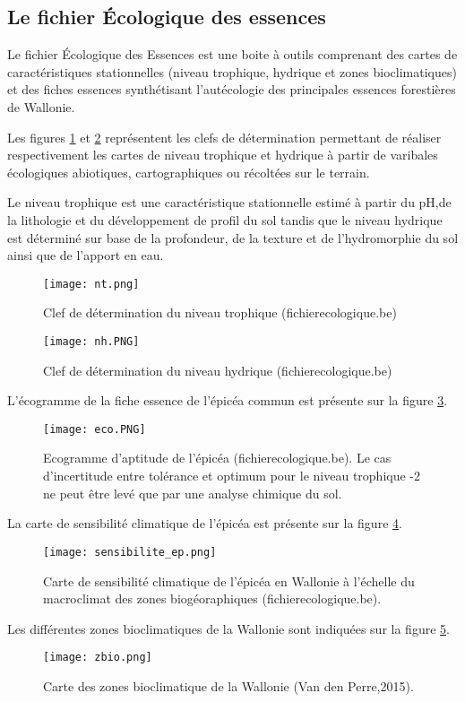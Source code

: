 \subsection{Le fichier Écologique des essences }


Le fichier Écologique des Essences est une boite à outils comprenant des cartes de caractéristiques stationnelles (niveau trophique, hydrique et zones bioclimatiques) et des fiches essences synthétisant l'autécologie des principales essences forestières de Wallonie.

Les figures \ref{fig:nt} et \ref{fig:nh} représentent les clefs de détermination permettant de réaliser respectivement les cartes de niveau trophique et hydrique à partir de varibales écologiques abiotiques, cartographiques ou récoltées sur le terrain.

Le niveau trophique est une caractéristique stationnelle estimé à partir du pH,de la lithologie et du développement de profil du sol tandis que le niveau hydrique est déterminé sur base de la profondeur, de la texture et  de l'hydromorphie du sol ainsi que  de l'apport en eau.

\begin{figure} [htbp] 
    \centering
    \texttt{[image: nt.png]}
    \caption{Clef de détermination du niveau trophique (fichierecologique.be)}
    \label{fig:nt}
\end{figure}
 
\begin{figure} [htbp] 
    \centering
    \texttt{[image: nh.PNG]}
    \caption{Clef de détermination du niveau hydrique (fichierecologique.be) }
    \label{fig:nh}
\end{figure}


L'écogramme de la fiche essence de l'épicéa commun est présente sur la figure \ref{fig:eco}.
\begin{figure} [htbp] 
    \centering
    \texttt{[image: eco.PNG]}
    \caption{Ecogramme d'aptitude de l'épicéa (fichierecologique.be). Le cas d'incertitude entre tolérance et optimum pour le niveau trophique -2 ne peut être levé que par une analyse chimique du sol. }
    \label{fig:eco}
\end{figure}

La carte de sensibilité climatique de l'épicéa est présente sur la figure \ref{fig:sens}.
\begin{figure} [htbp] 
    \centering
    \texttt{[image: sensibilite\_ep.png]}
    \caption{Carte de sensibilité climatique de l'épicéa en Wallonie à l'échelle du macroclimat des zones biogéoraphiques (fichierecologique.be).}
    \label{fig:sens}
\end{figure}
Les différentes zones bioclimatiques de la Wallonie sont indiquées sur la figure \ref{fig:zbio}.
\begin{figure} [htbp] 
    \centering
    \texttt{[image: zbio.png]}
    \caption{Carte des zones bioclimatique de la Wallonie (Van den Perre,2015). }
    \label{fig:zbio}
\end{figure}


